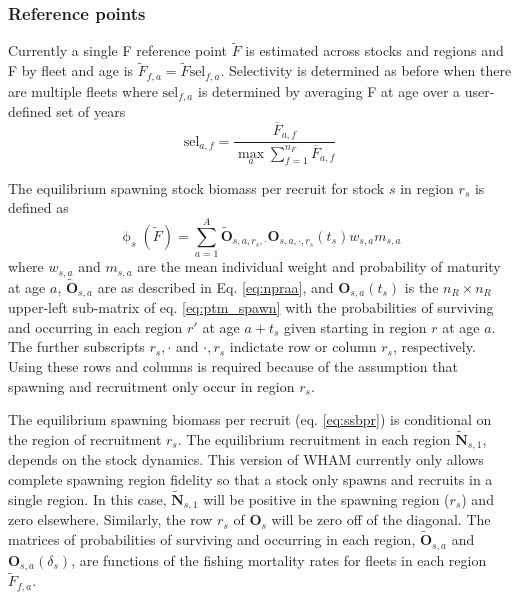 \documentclass[
]{article}
\begin{document}
\hypertarget{reference-points}{%
\subsubsection*{Reference points}\label{reference-points}}

Currently a single F reference point \(\widetilde F\) is estimated
across stocks and regions and F by fleet and age is
\(\widetilde F_{f,a} = \widetilde F \text{sel}_{f,a}\). Selectivity is
determined as before when there are multiple fleets where
\(\text{sel}_{f,a}\) is determined by averaging F at age over a
user-defined set of years \begin{equation*}
  \text{sel}_{a,f} = \frac{\overline F_{a,f}}{\max_a \sum^{n_F}_{f=1}{\overline F}_{a,f}}
\end{equation*}

The equilibrium spawning stock biomass per recruit for stock \(s\) in
region \(r_s\) is defined as \begin{equation}\label{eq:ssbpr}
 \upphi_s(\widetilde{F}) = \sum^{A}_{a=1} \widetilde{\mathbf{O}}_{s,a,r_s,\cdot} \mathbf{O}_{s,a,\cdot,r_s}(t_s) w_{s,a} m_{s,a}
\end{equation} where \(w_{s,a}\) and \(m_{s,a}\) are the mean individual
weight and probability of maturity at age \(a\),
\(\widetilde{\mathbf{O}}_{s,a}\) are as described in Eq. \ref{eq:npraa},
and \(\mathbf{O}_{s,a}(t_s)\) is the \(n_R \times n_R\) upper-left
sub-matrix of eq. \ref{eq:ptm_spawn} with the probabilities of surviving
and occurring in each region \(r'\) at age \(a+t_s\) given starting in
region \(r\) at age \(a\). The further subscripts \(r_s,\cdot\) and
\(\cdot,r_s\) indictate row or column \(r_s\), respectively. Using these
rows and columns is required because of the assumption that spawning and
recruitment only occur in region \(r_s\).

The equilibrium spawning biomass per recruit (eq. \ref{eq:ssbpr}) is
conditional on the region of recruitment \(r_s\). The equilibrium
recruitment in each region \(\widetilde {\mathbf{N}}_{s,1}\), depends on
the stock dynamics. This version of WHAM currently only allows complete
spawning region fidelity so that a stock only spawns and recruits in a
single region. In this case, \(\widetilde {\mathbf{N}}_{s,1}\) will be
positive in the spawning region (\(r_s\)) and zero elsewhere. Similarly,
the row \(r_s\) of \(\mathbf{O}_s\) will be zero off of the diagonal.
The matrices of probabilities of surviving and occurring in each region,
\(\widetilde{\mathbf{O}}_{s,a}\) and \(\mathbf{O}_{s,a}(\delta_s)\), are
functions of the fishing mortality rates for fleets in each region
\(\widetilde F_{f,a}\).
\end{document}

